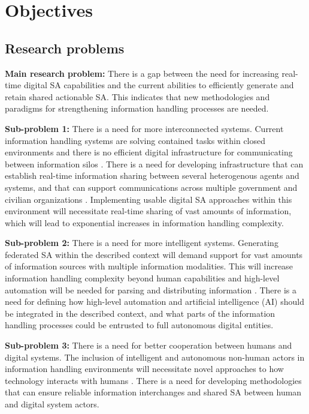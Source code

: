 \chapter{Objectives}
\section {Research problems}	
\textbf{Main research problem:} There is a gap between the need for increasing real-time digital SA capabilities and the current abilities to efficiently generate and retain shared actionable SA. This indicates that new methodologies and paradigms for strengthening information handling processes are needed.

\textbf{Sub-problem 1:} There is a need for more interconnected systems. Current information handling systems are solving contained tasks within closed environments and there is no efficient digital infrastructure for communicating between information silos \cite{arai_smart_2020}. There is a need for developing infrastructure that can establish real-time information sharing between several heterogenous agents and systems, and that can support communications across multiple government and civilian organizations \cite{halvorsen_evalueringsrapport_2021}. Implementing usable digital SA approaches within this environment will necessitate real-time sharing of vast amounts of information, which will lead to exponential increases in information handling complexity.  

\textbf{Sub-problem 2:} There is a need for more intelligent systems. Generating federated SA within the described context will demand support for vast amounts of information sources with multiple information modalities. This will increase information handling complexity beyond human capabilities and high-level automation will be needed for parsing and distributing information \cite{arai_smart_2020}. There is a need for defining how high-level automation and artificial intelligence (AI) should be integrated in the described context, and what parts of the information handling processes could be entrusted to full autonomous digital entities.

\textbf{Sub-problem 3:} There is a need for better cooperation between humans and digital systems. The inclusion of intelligent and autonomous non-human actors in information handling environments will necessitate novel approaches to how technology interacts with humans \cite{burcham_comprehensive_nodate}. There is a need for developing methodologies that can ensure reliable information interchanges and shared SA between human and digital system actors. 

